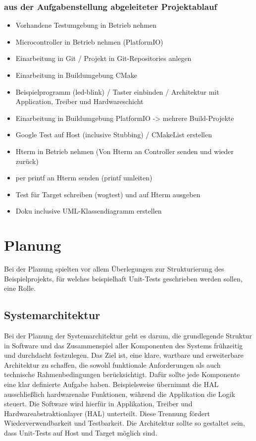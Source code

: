 \documentclass[12pt,a4paper]{article}
\begin{document}
\newpage
\subsubsection{aus der Aufgabenstellung abgeleiteter Projektablauf}
\begin{itemize}
  \item Vorhandene Testumgebung in Betrieb nehmen
  \item Microcontroller in Betrieb nehmen (PlatformIO)
  \item Einarbeitung in Git / Projekt in Git-Repositories anlegen
  \item Einarbeitung in Buildumgebung CMake
  \item Beispielprogramm (led-blink) / Taster einbinden / Architektur mit Application, Treiber und Hardwareschicht
  \item Einarbeitung in Buildumgebung PlatformIO -> mehrere Build-Projekte
  \item Google Test auf Host (inclusive Stubbing) / CMakeList erstellen
  \item Hterm in Betrieb nehmen (Von Hterm an Controller senden und wieder zurück)
  \item per printf an Hterm senden (printf umleiten)
  \item Test für Target schreiben (wogtest) und auf Hterm ausgeben
  \item Doku inclusive UML-Klassendiagramm erstellen
\end{itemize}



\newpage

\section{Planung}
Bei der Planung spielten vor allem Überlegungen zur Strukturierung des Beispielprojekts, für welches beispielhaft Unit-Tests geschrieben werden sollen, eine Rolle.
\subsection{Systemarchitektur}
Bei der Planung der Systemarchitektur geht es darum, die grundlegende Struktur in Software und das Zusammenspiel aller Komponenten des Systems frühzeitig und durchdacht festzulegen.
Das Ziel ist, eine klare, wartbare und erweiterbare Architektur zu schaffen, die sowohl funktionale Anforderungen als auch technische Rahmenbedingungen berücksichtigt.
Dafür sollte jede Komponente eine klar definierte Aufgabe haben.
Beispielsweise übernimmt die HAL ausschließlich hardwarenahe Funktionen, während die Applikation die Logik steuert.
Die Software wird hierfür in Applikation, Treiber und Hardwareabstraktionlayer (HAL) unterteilt. Diese Trennung fördert Wiederverwendbarkeit und Testbarkeit.
Die Architektur sollte so gestaltet sein, dass Unit-Tests auf Host und Target möglich sind.
\end{document}
